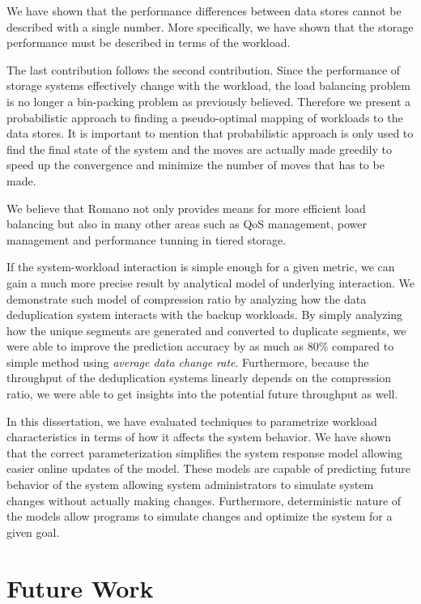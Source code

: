 We have shown that the performance differences between data stores cannot be described with a single number. More specifically, we have shown that the storage performance must be described in terms of the workload.

The last contribution follows the second contribution. Since the performance of storage systems effectively change with the workload, the load balancing problem is no longer a bin-packing problem as previously believed. 
Therefore we present a probabilistic approach to finding a pseudo-optimal mapping of workloads to the data stores. 
It is important to mention that probabilistic approach is only used to find the final state of the system and the moves are actually made greedily to speed up the convergence and minimize the number of moves that has to be made.

We believe that Romano not only provides means for more efficient load balancing but also in many other areas such as QoS management, power management and performance tunning in tiered storage.

If the system-workload interaction is simple enough for a given metric, we can gain a much more precise result by analytical model of underlying interaction.
We demonstrate such model of compression ratio by analyzing how the data deduplication system interacts with the backup workloads. 
By simply analyzing how the unique segments are generated and converted to duplicate segments, we were able to improve the prediction accuracy by as much as 80\% compared to simple method using \emph{average data change rate}.
Furthermore, because the throughput of the deduplication systems linearly depends on the compression ratio, we were able to get insights into the potential future throughput as well. 

In this dissertation, we have evaluated techniques to parametrize workload characteristics in terms of how it affects the system behavior. 
We have shown that the correct parameterization simplifies the system response model allowing easier online updates of the model.
These models are capable of predicting future behavior of the system allowing system administrators to simulate system changes without actually making changes.
Furthermore, deterministic nature of the models allow programs to simulate changes and optimize the system for a given goal. 

\section{Future Work}
